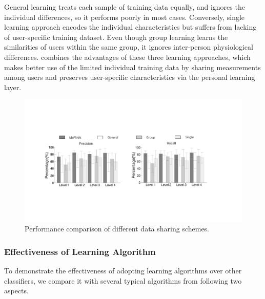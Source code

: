 General learning treats each sample of training data equally, and ignores the individual differences, so it performs poorly in most cases.
Conversely, single learning approach encodes the individual characteristics but suffers from lacking of user-specific training dataset. Even though group learning learns the similarities of users within the same group, it ignores inter-person physiological differences.
\modelname combines the advantages of these three learning approaches, which makes better use of the limited individual training data by sharing measurements among users and preserves user-specific characteristics via the personal learning layer.



\begin{figure}[h]
  \centering
  \includegraphics[width=0.9\columnwidth]{./img/performance_of_multi_division.pdf}
  \caption{Performance comparison of different data sharing schemes.}
  \label{fig:cmp_multi_division}
\end{figure}


\subsubsection{Effectiveness of \modelname Learning Algorithm}
To demonstrate the effectiveness of adopting \modelname learning algorithms over other classifiers, we compare it with several typical algorithms from following  two aspects.

